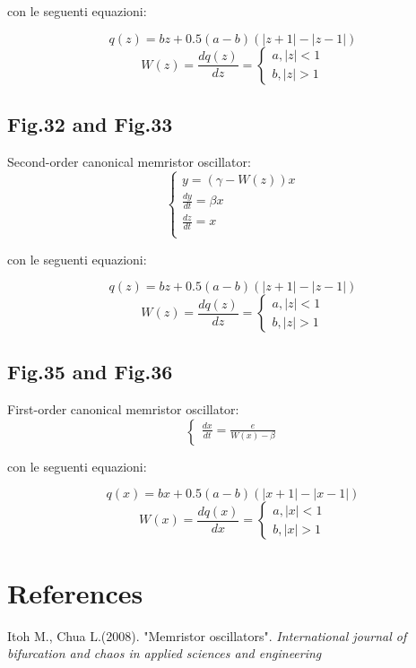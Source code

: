 \documentclass[12pt, a4paper]{book}
\begin{document}
con le seguenti equazioni:

\begin{equation}
q(z)=bz+0.5(a-b)(|z+1|-|z-1|)
\end{equation}
\begin{equation}
W(z)=\frac{dq(z)}{dz}=
\begin{cases}
a, |z|<1
\\
b, |z|>1
\end{cases}
\end{equation}

\subsection{Fig.32 and Fig.33}
Second-order canonical memristor oscillator:
\begin{equation}
\begin{cases}
y=(\gamma-W(z))x
\\
\frac{dy}{dt}=\beta x
\\
\frac{dz}{dt}=x
\\
\end{cases}
\end{equation}

con le seguenti equazioni:

\begin{equation}
q(z)=bz+0.5(a-b)(|z+1|-|z-1|)
\end{equation}
\begin{equation}
W(z)=\frac{dq(z)}{dz}=
\begin{cases}
a, |z|<1
\\
b, |z|>1
\end{cases}
\end{equation}

\subsection{Fig.35 and Fig.36}
First-order canonical memristor oscillator:
\begin{equation}
\begin{cases}
\frac{dx}{dt}=\frac{e}{W(x)-\beta}
\end{cases}
\end{equation}

con le seguenti equazioni:

\begin{equation}
q(x)=bx+0.5(a-b)(|x+1|-|x-1|)
\end{equation}
\begin{equation}
W(x)=\frac{dq(x)}{dx}=
\begin{cases}
a, |x|<1
\\
b, |x|>1
\end{cases}
\end{equation}

\section{References}
Itoh M., Chua L.(2008). "Memristor oscillators". \textit{International journal of bifurcation and chaos in applied sciences and engineering}
\end{document}
